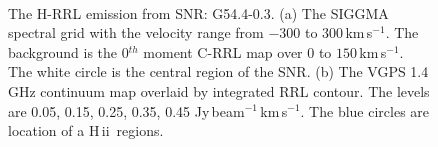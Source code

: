 \documentclass[manuscript]{aastex61}
\newcommand{\hii}{{\rm H\,}{{\sc ii}}}
\newcommand{\kms}{\,km\,s$^{-1}$}
\begin{document}
\begin{figure}[H]
\centering
{}
\\
\caption{The H-RRL emission from SNR: G54.4-0.3.
          (a) The SIGGMA spectral grid with the velocity range from $-300$ to $300$\kms.
	  The background is the 0$^{th}$ moment C-RRL map over $0$ to $150$\kms.
	  The white circle is the central region of the SNR.
	  (b) The VGPS 1.4 GHz continuum map overlaid by integrated RRL contour.
	  The levels are 0.05, 0.15, 0.25, 0.35, 0.45 Jy\,beam$^{-1}$\kms.
	  The blue circles are location of a \hii\ regions.
	  }
\label{fig_snr-g544}
\end{figure}
\end{document}
